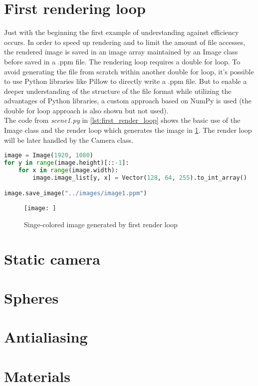 \documentclass[]{article}
\begin{document}
	\section{First rendering loop}
	Just with the beginning the first example of understanding against efficiency occurs. In order to speed up rendering and to limit the amount of file accesses, the rendered image is saved in an image array maintained by an Image class before saved in a .ppm file. The rendering loop requires a double for loop. To avoid generating the file from scratch within another double for loop, it’s possible to use Python libraries like Pillow to directly write a .ppm file. But to enable a deeper understanding of the structure of the file format while utilizing the advantages of Python libraries, a custom approach based on NumPy is used (the double for loop approach is also shown but not used).
	\\
	The code from \emph{scene1.py} in \cref{lst:first_render_loop} shows the basic use of the Image class and the render loop which generates the image in \cref{fig:image1}. The render loop will be later handled by the Camera class.
	
	\begin{lstlisting}[caption={Example for a basic render loop}, language=Python, label=lst:first_render_loop]
image = Image(1920, 1080)
for y in range(image.height)[::-1]:
	for x in range(image.width):
		image.image_list[y, x] = Vector(128, 64, 255).to_int_array()

image.save_image("../images/image1.ppm")
	\end{lstlisting}

	\begin{figure}[h]
		\centering
		\texttt{[image: ]}
		\caption{Singe-colored image generated by first render loop}
		\label{fig:image1}
	\end{figure}

	\section{Static camera}
	\section{Spheres}
	\section{Antialiasing}
	\section{Materials}
\end{document}

